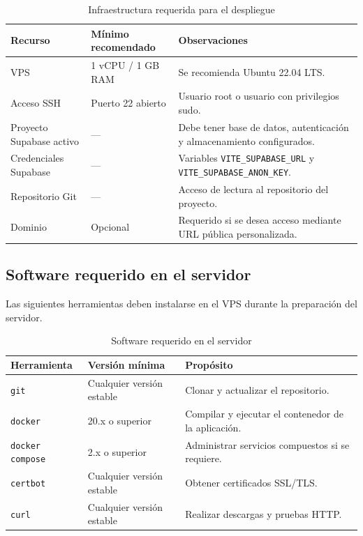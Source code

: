 \documentclass[12pt,letterpaper]{article}
\newcommand{\code}[1]{\nolinkurl{#1}}
\newcommand{\dash}{---}
\begin{document}
\begin{longtable}{|p{}|p{}|p{}|}
\caption{Infraestructura requerida para el despliegue}\\
\hline
\textbf{Recurso} & \textbf{Mínimo recomendado} & \textbf{Observaciones} \\
\hline
VPS & 1 vCPU / 1 GB RAM & Se recomienda Ubuntu 22.04 LTS. \\
\hline
Acceso SSH & Puerto 22 abierto & Usuario root o usuario con privilegios sudo. \\
\hline
Proyecto Supabase activo & \dash & Debe tener base de datos, autenticación y almacenamiento configurados. \\
\hline
Credenciales Supabase & \dash & Variables \code{VITE_SUPABASE_URL} y \code{VITE_SUPABASE_ANON_KEY}. \\
\hline
Repositorio Git & \dash & Acceso de lectura al repositorio del proyecto. \\
\hline
Dominio & Opcional & Requerido si se desea acceso mediante URL pública personalizada. \\
\hline
\end{longtable}

\subsection{Software requerido en el servidor}

Las siguientes herramientas deben instalarse en el VPS durante la preparación del servidor.

\begin{longtable}{|p{}|p{}|p{}|}
\caption{Software requerido en el servidor}\\
\hline
\textbf{Herramienta} & \textbf{Versión mínima} & \textbf{Propósito} \\
\hline
\code{git} & Cualquier versión estable & Clonar y actualizar el repositorio. \\
\hline
\code{docker} & 20.x o superior & Compilar y ejecutar el contenedor de la aplicación. \\
\hline
\code{docker compose} & 2.x o superior & Administrar servicios compuestos si se requiere. \\
\hline
\code{certbot} & Cualquier versión estable & Obtener certificados SSL/TLS. \\
\hline
\code{curl} & Cualquier versión estable & Realizar descargas y pruebas HTTP. \\
\hline
\end{longtable}
\end{document}
